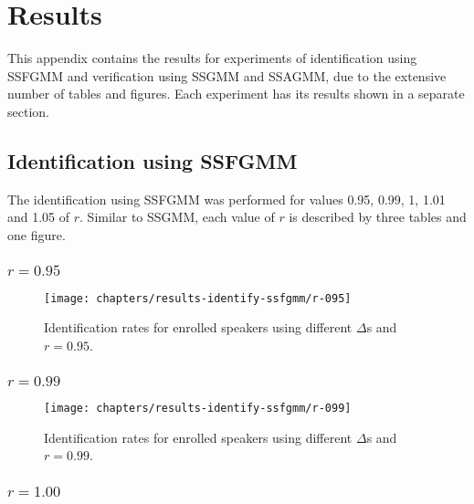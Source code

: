 \chapter{Results}
\label{apx:results}

This appendix contains the results for experiments of identification using SSFGMM and verification using SSGMM and SSAGMM, due to the extensive number of tables and figures. Each experiment has its results shown in a separate section.

\section{Identification using SSFGMM}
\label{sec:results-identify-ssfgmm}

The identification using SSFGMM was performed for values 0.95, 0.99, 1, 1.01 and 1.05 of $r$. Similar to SSGMM, each value of $r$ is described by three tables and one figure.

\subsection{$r = 0.95$}



\newpage
\begin{figure}[ht]
    \centering
    \texttt{[image: chapters/results-identify-ssfgmm/r-095]}
    \caption{Identification rates for enrolled speakers using different $\Delta$s and $r = 0.95$.}
    \label{fig:r-095}
\end{figure}

\newpage
\subsection{$r = 0.99$}



\newpage
\begin{figure}[ht]
    \centering
    \texttt{[image: chapters/results-identify-ssfgmm/r-099]}
    \caption{Identification rates for enrolled speakers using different $\Delta$s and $r = 0.99$.}
    \label{fig:r-099}
\end{figure}

\newpage
\subsection{$r = 1.00$}

